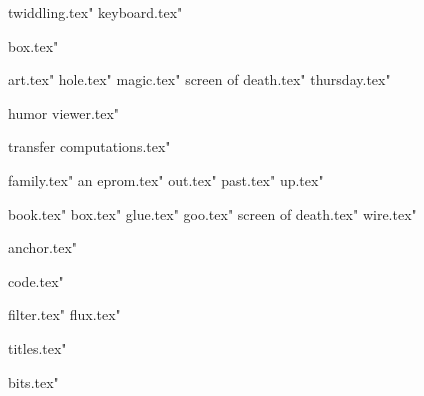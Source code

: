  twiddling.tex"
 keyboard.tex"




 box.tex"


 art.tex"
 hole.tex"
 magic.tex"
 screen of death.tex"
 thursday.tex"




 humor viewer.tex"









 transfer computations.tex"

 family.tex"
 an eprom.tex"
 out.tex"
 past.tex"
 up.tex"

 book.tex"
 box.tex"
 glue.tex"
 goo.tex"
 screen of death.tex"
 wire.tex"




 anchor.tex"

 code.tex"





 filter.tex"
 flux.tex"



 titles.tex"






 bits.tex"



